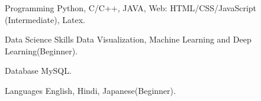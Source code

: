 


\begin{cvskills}


\cvskill
{Programming} %
{Python, C/C++, JAVA, Web: HTML/CSS/JavaScript (Intermediate), Latex.} %


\cvskill
{Data Science Skills} %
{Data Visualization, Machine Learning and Deep Learning(Beginner).} %

\cvskill
{Database} %
{MySQL.} %


\cvskill
{Languages} %
{English, Hindi, Japanese(Beginner).} %


\end{cvskills}